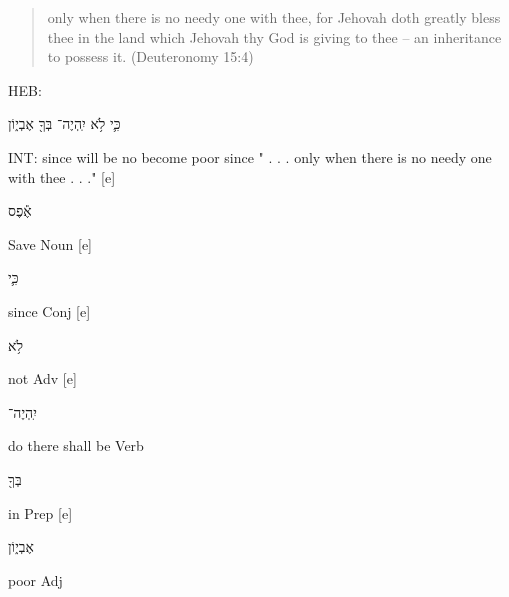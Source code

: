 \documentclass[11pt]{article}
\begin{document}
\begin{quote}
only when there is no needy one with thee, for Jehovah doth greatly bless thee in the land which Jehovah thy God is giving to thee -- an inheritance to possess it.
(Deuteronomy 15:4)
\end{quote}
HEB:\begin{hebrew} כִּ֛י לֹ֥א יִֽהְיֶה־ בְּךָ֖ אֶבְי֑וֹן \end{hebrew}\newline
INT: since will be no become poor since\newline
" . . . only when there is no needy one with thee . . ." [e]	%
\begin{hebrew}אֶ֕פֶס\end{hebrew}	Save	Noun [e]%
\begin{hebrew}	כִּ֛י	\end{hebrew}since	Conj [e]%
\begin{hebrew}לֹ֥א	\end{hebrew}not	Adv [e]%
\begin{hebrew}יִֽהְיֶה־	\end{hebrew}do there shall be	Verb\newline
\phantom{1961 [e]	} \begin{hebrew}בְּךָ֖	\end{hebrew}in	Prep [e]%
\begin{hebrew} אֶבְי֑וֹן \end{hebrew}	poor	Adj\newline \newline
\end{document}
